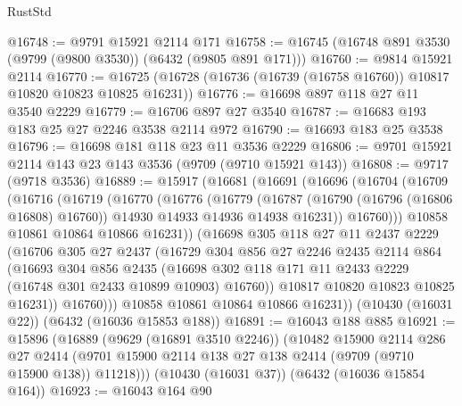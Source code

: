 \begin{lexlean}{RustStd}
\begin{coremodule}
@16748 := @9791 @15921 @2114 @171
@16758 := @16745 (@16748 @891 @3530 (@9799 (@9800 @3530)) (@6432 (@9805 @891 @171)))
@16760 := @9814 @15921 @2114
@16770 := @16725 (@16728 (@16736 (@16739 (@16758 @16760)) @10817 @10820 @10823 @10825 @16231))
@16776 := @16698 @897 @118 @27 @11 @3540 @2229
@16779 := @16706 @897 @27 @3540
@16787 := @16683 @193 @183 @25 @27 @2246 @3538 @2114 @972
@16790 := @16693 @183 @25 @3538
@16796 := @16698 @181 @118 @23 @11 @3536 @2229
@16806 := @9701 @15921 @2114 @143 @23 @143 @3536 (@9709 (@9710 @15921 @143))
@16808 := @9717 (@9718 @3536)
@16889 := @15917
    (@16681
      (@16691
        (@16696
          (@16704
            (@16709
              (@16716
                (@16719
                  (@16770
                    (@16776
                      (@16779
                        (@16787
                          (@16790 (@16796 (@16806 @16808) @16760))
                          @14930
                          @14933
                          @14936
                          @14938
                          @16231))
                      @16760)))
                @10858
                @10861
                @10864
                @10866
                @16231))
            (@16698
              @305
              @118
              @27
              @11
              @2437
              @2229
              (@16706
                @305
                @27
                @2437
                (@16729
                  @304
                  @856
                  @27
                  @2246
                  @2435
                  @2114
                  @864
                  (@16693
                    @304
                    @856
                    @2435
                    (@16698
                      @302
                      @118
                      @171
                      @11
                      @2433
                      @2229
                      (@16748 @301 @2433 @10899 @10903)
                      @16760))
                  @10817
                  @10820
                  @10823
                  @10825
                  @16231))
              @16760)))
        @10858
        @10861
        @10864
        @10866
        @16231))
    (@10430 (@16031 @22))
    (@6432 (@16036 @15853 @188))
@16891 := @16043 @188 @885
@16921 := @15896
    (@16889
      (@9629 (@16891 @3510 @2246))
      (@10482
        @15900
        @2114
        @286
        @27
        @2414
        (@9701 @15900 @2114 @138 @27 @138 @2414 (@9709 (@9710 @15900 @138)) @11218)))
    (@10430 (@16031 @37))
    (@6432 (@16036 @15854 @164))
@16923 := @16043 @164 @90

\end{coremodule}
\end{lexlean}
